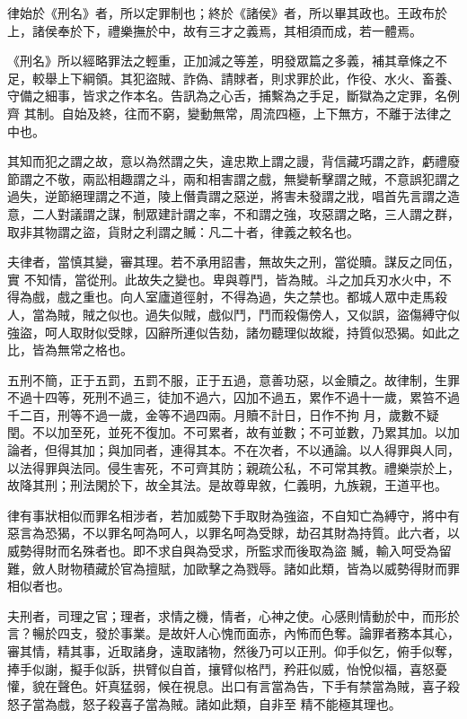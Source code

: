 \begin{pinyinscope}
 律始於《刑名》者，所以定罪制也；終於《諸侯》者，所以畢其政也。王政布於上，諸侯奉於下，禮樂撫於中，故有三才之義焉，其相須而成，若一體焉。



 《刑名》所以經略罪法之輕重，正加減之等差，明發眾篇之多義，補其章條之不足，較舉上下綱領。其犯盜賊、詐偽、請賕者，則求罪於此，作役、水火、畜養、守備之細事，皆求之作本名。告訊為之心舌，捕繫為之手足，斷獄為之定罪，名例齊
 其制。自始及終，往而不窮，變動無常，周流四極，上下無方，不離于法律之中也。



 其知而犯之謂之故，意以為然謂之失，違忠欺上謂之謾，背信藏巧謂之詐，虧禮廢節謂之不敬，兩訟相趣謂之斗，兩和相害謂之戲，無變斬擊謂之賊，不意誤犯謂之過失，逆節絕理謂之不道，陵上僭貴謂之惡逆，將害未發謂之戕，唱首先言謂之造意，二人對議謂之謀，制眾建計謂之率，不和謂之強，攻惡謂之略，三人謂之群，取非其物謂之盜，貨財之利謂之贓：凡二十者，律義之較名也。



 夫律者，當慎其變，審其理。若不承用詔書，無故失之刑，當從贖。謀反之同伍，實
 不知情，當從刑。此故失之變也。卑與尊鬥，皆為賊。斗之加兵刃水火中，不得為戲，戲之重也。向人室廬道徑射，不得為過，失之禁也。都城人眾中走馬殺人，當為賊，賊之似也。過失似賊，戲似鬥，鬥而殺傷傍人，又似誤，盜傷縛守似強盜，呵人取財似受賕，囚辭所連似告劾，諸勿聽理似故縱，持質似恐猲。如此之比，皆為無常之格也。



 五刑不簡，正于五罰，五罰不服，正于五過，意善功惡，以金贖之。故律制，生罪不過十四等，死刑不過三，徒加不過六，囚加不過五，累作不過十一歲，累笞不過千二百，刑等不過一歲，金等不過四兩。月贖不計日，日作不拘
 月，歲數不疑閏。不以加至死，並死不復加。不可累者，故有並數；不可並數，乃累其加。以加論者，但得其加；與加同者，連得其本。不在次者，不以通論。以人得罪與人同，以法得罪與法同。侵生害死，不可齊其防；親疏公私，不可常其教。禮樂崇於上，故降其刑；刑法閑於下，故全其法。是故尊卑敘，仁義明，九族親，王道平也。



 律有事狀相似而罪名相涉者，若加威勢下手取財為強盜，不自知亡為縛守，將中有惡言為恐猲，不以罪名呵為呵人，以罪名呵為受賕，劫召其財為持質。此六者，以威勢得財而名殊者也。即不求自與為受求，所監求而後取為盜
 贓，輸入呵受為留難，斂人財物積藏於官為擅賦，加歐擊之為戮辱。諸如此類，皆為以威勢得財而罪相似者也。



 夫刑者，司理之官；理者，求情之機，情者，心神之使。心感則情動於中，而形於言？暢於四支，發於事業。是故奸人心愧而面赤，內怖而色奪。論罪者務本其心，審其情，精其事，近取諸身，遠取諸物，然後乃可以正刑。仰手似乞，俯手似奪，捧手似謝，擬手似訴，拱臂似自首，攘臂似格鬥，矜莊似威，怡悅似福，喜怒憂懽，貌在聲色。奸真猛弱，候在視息。出口有言當為告，下手有禁當為賊，喜子殺怒子當為戲，怒子殺喜子當為賊。諸如此類，自非至
 精不能極其理也。




\end{pinyinscope}
